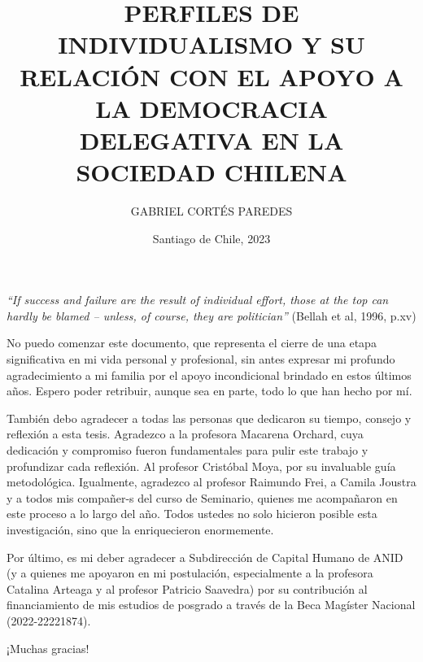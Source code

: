 \documentclass[12pt,twoside]{templates/facsothesis}
\title{PERFILES DE INDIVIDUALISMO Y SU RELACIÓN CON EL APOYO A LA DEMOCRACIA DELEGATIVA EN LA SOCIEDAD CHILENA}
\author{GABRIEL CORTÉS PAREDES}
\date{Santiago de Chile, 2023}
\begin{document}
\raggedbottom

  \maketitle

\frontmatter %
 \pagestyle{empty} 

  \begin{prefacio}
  \thispagestyle{empty}
    \emph{``If success and failure are the result of individual effort, those at the top can hardly be blamed -- unless, of course, they are politician''} (Bellah et al, 1996, p.xv)
  \end{prefacio}

  \begin{agradecimientos}
  \thispagestyle{empty}
  \setlength\parskip{1em plus 0.1em minus 0.2em}
    No puedo comenzar este documento, que representa el cierre de una etapa significativa en mi vida personal y profesional, sin antes expresar mi profundo agradecimiento a mi familia por el apoyo incondicional brindado en estos últimos años. Espero poder retribuir, aunque sea en parte, todo lo que han hecho por mí.

    También debo agradecer a todas las personas que dedicaron su tiempo, consejo y reflexión a esta tesis. Agradezco a la profesora Macarena Orchard, cuya dedicación y compromiso fueron fundamentales para pulir este trabajo y profundizar cada reflexión. Al profesor Cristóbal Moya, por su invaluable guía metodológica. Igualmente, agradezco al profesor Raimundo Frei, a Camila Joustra y a todos mis compañer-s del curso de Seminario, quienes me acompañaron en este proceso a lo largo del año. Todos ustedes no solo hicieron posible esta investigación, sino que la enriquecieron enormemente.

    Por último, es mi deber agradecer a Subdirección de Capital Humano de ANID (y a quienes me apoyaron en mi postulación, especialmente a la profesora Catalina Arteaga y al profesor Patricio Saavedra) por su contribución al financiamiento de mis estudios de posgrado a través de la Beca Magíster Nacional (2022-22221874).

    ¡Muchas gracias!
  \end{agradecimientos}
\end{document}
